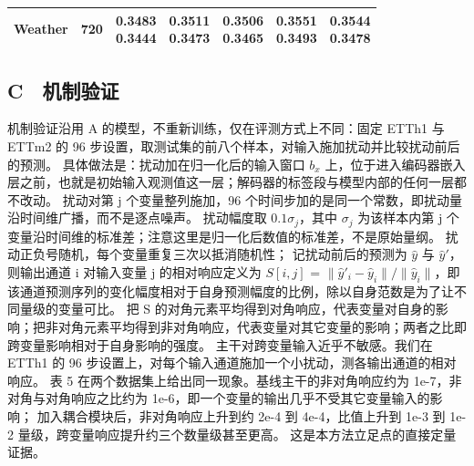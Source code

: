 \begin{center}
\begin{minipage}{\textwidth}
\begin{tabular}{@{}llccccc@{}}
Weather & 720 & \shortstack{\colorbox[gray]{0.82}{\textbf{0.3483}}\\\colorbox[gray]{0.82}{\textbf{0.3444}}} & \shortstack{0.3511\\0.3473} & \shortstack{\colorbox[gray]{0.92}{0.3506}\\\colorbox[gray]{0.92}{0.3465}} & \shortstack{0.3551\\0.3493} & \shortstack{0.3544\\0.3478} \\ \hline

\end{tabular}

\end{minipage}

\end{center}

\subsection{C　机制验证}

机制验证沿用 A 的模型，不重新训练，仅在评测方式上不同：固定 ETTh1 与 ETTm2 的 96 步设置，取测试集的前八个样本，对输入施加扰动并比较扰动前后的预测。
具体做法是：扰动加在归一化后的输入窗口 $b_x$ 上，位于进入编码器嵌入层之前，也就是初始输入观测值这一层；解码器的标签段与模型内部的任何一层都不改动。
扰动对第 j 个变量整列施加，96 个时间步加的是同一个常数，即扰动量沿时间维广播，而不是逐点噪声。
扰动幅度取 $0.1\sigma_j$，其中 $\sigma_j$ 为该样本内第 j 个变量沿时间维的标准差；注意这里是归一化后数值的标准差，不是原始量纲。
扰动正负号随机，每个变量重复三次以抵消随机性；
记扰动前后的预测为 $\hat{y}$ 与 $\hat{y}'$，则输出通道 i 对输入变量 j 的相对响应定义为 $S[i,j]$ = $\|\hat{y}'_i-\hat{y}_i\|/\|\hat{y}_i\|$，即该通道预测序列的变化幅度相对于自身预测幅度的比例，除以自身范数是为了让不同量级的变量可比。
把 S 的对角元素平均得到对角响应，代表变量对自身的影响；把非对角元素平均得到非对角响应，代表变量对其它变量的影响；两者之比即跨变量影响相对于自身影响的强度。
主干对跨变量输入近乎不敏感。我们在 ETTh1 的 96 步设置上，对每个输入通道施加一个小扰动，测各输出通道的相对响应。
表 5 在两个数据集上给出同一现象。基线主干的非对角响应约为 1e-7，非对角与对角响应之比约为 1e-6，即一个变量的输出几乎不受其它变量输入的影响；
加入耦合模块后，非对角响应上升到约 2e-4 到 4e-4，比值上升到 1e-3 到 1e-2 量级，跨变量响应提升约三个数量级甚至更高。
这是本方法立足点的直接定量证据。

